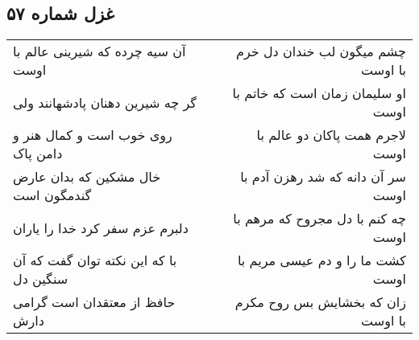 \begin{center}
\section*{غزل شماره ۵۷}
\label{sec:sh057}
\begin{longtable}{l p{0.5cm} r}
آن سیه چرده که شیرینی عالم با اوست
&&
چشم میگون لب خندان دل خرم با اوست
\\
گر چه شیرین دهنان پادشهانند ولی
&&
او سلیمان زمان است که خاتم با اوست
\\
روی خوب است و کمال هنر و دامن پاک
&&
لاجرم همت پاکان دو عالم با اوست
\\
خال مشکین که بدان عارض گندمگون است
&&
سر آن دانه که شد رهزن آدم با اوست
\\
دلبرم عزم سفر کرد خدا را یاران
&&
چه کنم با دل مجروح که مرهم با اوست
\\
با که این نکته توان گفت که آن سنگین دل
&&
کشت ما را و دم عیسی مریم با اوست
\\
حافظ از معتقدان است گرامی دارش
&&
زان که بخشایش بس روح مکرم با اوست
\\
\end{longtable}
\end{center}
